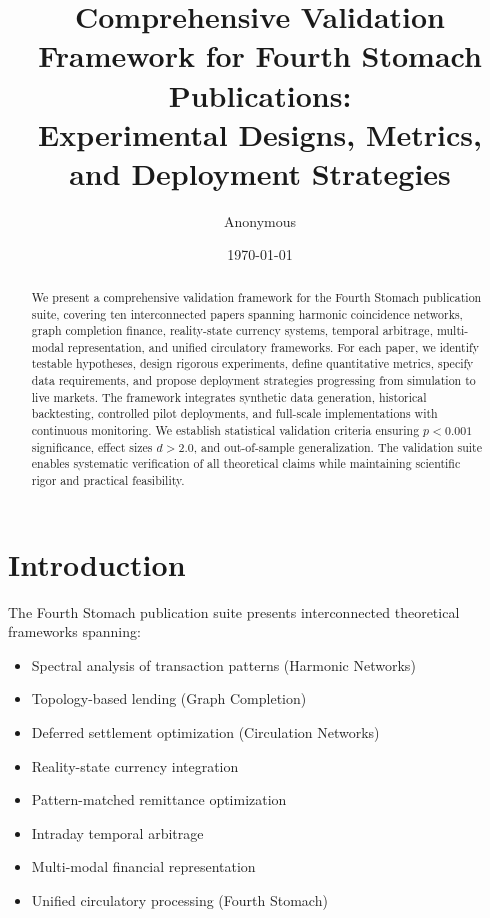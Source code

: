 \documentclass[12pt]{article}
\title{Comprehensive Validation Framework for Fourth Stomach Publications:\\
Experimental Designs, Metrics, and Deployment Strategies}
\author{Anonymous}
\date{\today}
\begin{document}
\maketitle

\begin{abstract}
We present a comprehensive validation framework for the Fourth Stomach publication suite, covering ten interconnected papers spanning harmonic coincidence networks, graph completion finance, reality-state currency systems, temporal arbitrage, multi-modal representation, and unified circulatory frameworks. For each paper, we identify testable hypotheses, design rigorous experiments, define quantitative metrics, specify data requirements, and propose deployment strategies progressing from simulation to live markets. The framework integrates synthetic data generation, historical backtesting, controlled pilot deployments, and full-scale implementations with continuous monitoring. We establish statistical validation criteria ensuring $p < 0.001$ significance, effect sizes $d > 2.0$, and out-of-sample generalization. The validation suite enables systematic verification of all theoretical claims while maintaining scientific rigor and practical feasibility.
\end{abstract}

\section{Introduction}

The Fourth Stomach publication suite presents interconnected theoretical frameworks spanning:
\begin{itemize}
    \item Spectral analysis of transaction patterns (Harmonic Networks)
    \item Topology-based lending (Graph Completion)
    \item Deferred settlement optimization (Circulation Networks)
    \item Reality-state currency integration
    \item Pattern-matched remittance optimization
    \item Intraday temporal arbitrage
    \item Multi-modal financial representation
    \item Unified circulatory processing (Fourth Stomach)
\end{itemize}
\end{document}
